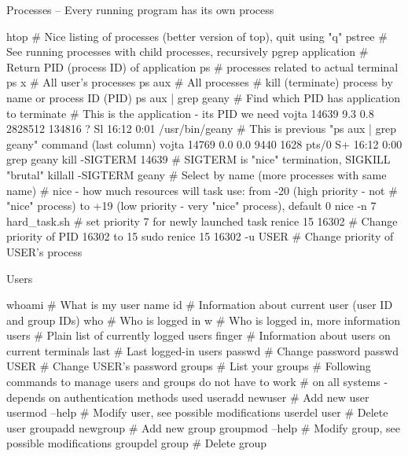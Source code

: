 \documentclass[compress, ucs, xelatex, 11pt, xcolor=svgnames,
  hyperref={
    bookmarks=true,
    unicode=true,
    colorlinks=true,
    pdftitle={Linux, command line and MetaCentrum},
    plainpages=false,
    pdfauthor={Vojtech Zeisek},
    pdfsubject={Course about use of Linux command line, writing shell scripts and using MetaCentrum of CESNET},
    pdfcreator={XeLaTeX},
    pdfkeywords={Linux, GNU, BASH, shell, command line, MetaCentrum},
    linkcolor=Red,
    anchorcolor=Blue,
    citecolor=Purple,
    filecolor=DodgerBlue,
    menucolor=DarkOrchid,
    urlcolor=DeepSkyBlue,
    pdftex},
  url={hyphens, lowtilde} %
  ]{beamer}
\begin{document}
\begin{frame}[fragile]{Processes -- Every running program has its own process}
  \begin{bashcode}
    htop # Nice listing of processes (better version of top), quit using "q"
    pstree # See running processes with child processes, recursively
    pgrep application # Return PID (process ID) of application
    ps # processes related to actual terminal
    ps x # All user's processes
    ps aux # All processes
    # kill (terminate) process by name or process ID (PID)
    ps aux | grep geany # Find which PID has application to terminate
    # This is the application - its PID we need
    vojta 14639 9.3 0.8 2828512 134816 ?   Sl 16:12 0:01 /usr/bin/geany
    # This is previous "ps aux | grep geany" command (last column)
    vojta 14769 0.0 0.0   9440  1628 pts/0 S+ 16:12 0:00 grep geany
    kill -SIGTERM 14639 # SIGTERM is "nice" termination, SIGKILL "brutal"
    killall -SIGTERM geany # Select by name (more processes with same name)
    # nice - how much resources will task use: from -20 (high priority - not
    # "nice" process) to +19 (low priority - very "nice" process), default 0
    nice -n 7 hard_task.sh # set priority 7 for newly launched task
    renice 15 16302 # Change priority of PID 16302 to 15
    sudo renice 15 16302 -u USER # Change priority of USER's process
  \end{bashcode}
\end{frame}

\begin{frame}[fragile]{Users}
  \begin{bashcode}
    whoami # What is my user name
    id # Information about current user (user ID and group IDs)
    who # Who is logged in
    w # Who is logged in, more information
    users # Plain list of currently logged users
    finger # Information about users on current terminals
    last # Last logged-in users
    passwd # Change password
    passwd USER # Change USER's password
    groups # List your groups
    # Following commands to manage users and groups do not have to work
    # on all systems - depends on authentication methods used
    useradd newuser # Add new user
    usermod --help # Modify user, see possible modifications
    userdel user # Delete user
    groupadd newgroup # Add new group
    groupmod --help # Modify group, see possible modifications
    groupdel group # Delete group
  \end{bashcode}
\end{frame}
\end{document}
